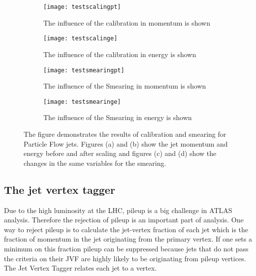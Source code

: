 \begin{figure}
\centering
\begin{subfigure}[b]{0.5\figwidth}
\texttt{[image: testscalingpt]}
\caption[Influence of the JES on the transverse momentum]{The influence of the calibration in momentum is shown}
\label{fig:testscalingpt}
\end{subfigure}
\quad
\begin{subfigure}[b]{0.5\figwidth}
\texttt{[image: testscalinge]}
\caption[Influence of the JES on the energy]{The influence of the calibration in energy is shown}
\label{fig:testscalinge}
\end{subfigure}


\begin{subfigure}[b]{0.5\figwidth}
\texttt{[image: testsmearingpt]}
\caption[Influence of the Smearing on the transverse momentum]{The influence of the Smearing in momentum is shown}
\label{fig:testsmearingpt}
\end{subfigure}
\quad
\begin{subfigure}[b]{0.5\figwidth}
\texttt{[image: testsmearinge]}
\caption[Influence of the Smearing on the energy]{The influence of the Smearing in energy is shown}
\label{fig:testsmearinge}
\end{subfigure}
\caption[Jet Calibration and Smearing]{The figure demonstrates the results of calibration and smearing for Particle Flow jets. Figures (a) and (b) show the jet momentum and energy before and after scaling and figures (c) and (d) show the changes in the same variables for the smearing.}
\label{jetsmearingandcalibration}
\end{figure}


\subsection{The jet vertex tagger}

Due to the high luminosity at the LHC, pileup is a big challenge in ATLAS analysis. Therefore the rejection of pileup is an important part of analysis. One way to reject pileup is to calculate the jet-vertex fraction of each jet which is the fraction of momentum in the jet originating from the primary vertex. If one sets a minimum on this fraction pileup can be suppressed because jets that do not pass the criteria on their JVF are highly likely to be originating from pileup vertices. The Jet Vertex Tagger relates each jet to a vertex.


